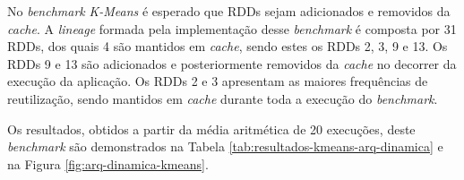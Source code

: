 No \textit{benchmark} \textit{K-Means} é esperado que RDDs sejam adicionados e removidos da \textit{cache}. A \textit{lineage} formada pela implementação desse \textit{benchmark} é composta por 31 RDDs, dos quais 4 são mantidos em \textit{cache}, sendo estes os RDDs 2, 3, 9 e 13. Os RDDs 9 e 13 são adicionados e posteriormente removidos da \textit{cache} no decorrer da execução da aplicação. Os RDDs 2 e 3 apresentam as maiores frequências de reutilização, sendo mantidos em \textit{cache} durante toda a execução do \textit{benchmark}.

Os resultados, obtidos a partir da média aritmética de 20 execuções, deste \textit{benchmark} são demonstrados na Tabela \ref{tab:resultados-kmeans-arq-dinamica} e na Figura \ref{fig:arq-dinamica-kmeans}. 

\begin{table}[!ht]
    \caption{Tempos de Execuções Obtidos no \textit{Benchmark} \textit{K-Means}}
    \label{tab:resultados-kmeans-arq-dinamica}
    \centering
\end{table}

